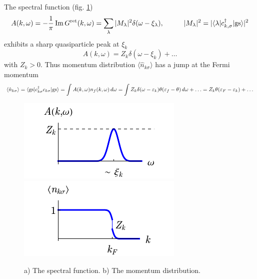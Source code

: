 The spectral function (fig. \ref{fig:Apeak})
\begin{equation*}
	A(k, \omega) = - \frac{1}{\pi} \Im G^{\text{ret}} (k, \omega) = \sum_\lambda |M_\lambda|^2 \delta(\omega-\xi_\lambda),
	\hspace{10 mm} 
	|M_\lambda|^2 = |\bk{\lambda}[c\D_{k, \sigma}]{\text{gs}}|^2
\end{equation*}
exhibits a sharp quasiparticle peak at $\xi_k$
\begin{equation*}
	A(k, \omega) = Z_k \delta(\omega - \xi_k) + \ldots
\end{equation*}
with $Z_k > 0$. Thus momentum distribution $\langle \hat{n}_{k \sigma}\rangle$  has a jump at the Fermi momentum
\begin{equation*}
	\langle \hat{n}_{k \sigma}\rangle = \bk{\text{gs}}[c\D_{k \sigma} c_{k \sigma}]{\text{gs}} =
 \int A(k, \omega) n_f(k, \omega) \d \omega = \int Z_k \delta(\omega-\varepsilon_k) \theta(\varepsilon_f - \theta)  \d \omega + \ldots 
	= Z_k \theta(\varepsilon_F - \varepsilon_k) + \ldots
\end{equation*}

\begin{figure}[h]
    \centering
    \includegraphics{imgs/Apeak.pdf}
    \hspace{10 mm} 
    \includegraphics{imgs/npeak.pdf}
    \caption{a) The spectral function. b) The momentum distribution.}
    \label{fig:Apeak}
\end{figure}
